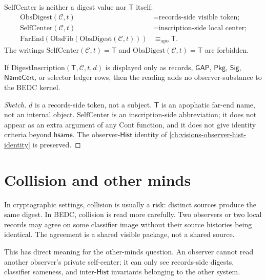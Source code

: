 \begin{principle}
\label{prin:hash-like-self-not-digest-not-T}
$\mathrm{SelfCenter}$ is neither a digest value nor $\mathsf{T}$ itself:
$$
\begin{aligned}
\mathrm{ObsDigest}(\mathcal{C}, t) &= \text{records-side visible token;} \\
\mathrm{SelfCenter}(\mathcal{C}, t) &= \text{inscription-side local center;} \\
\mathrm{FarEnd}(\mathrm{ObsFib}(\mathrm{ObsDigest}(\mathcal{C}, t))) &\equiv_{\mathrm{apo}} \mathsf{T}.
\end{aligned}
$$
The writings $\mathrm{SelfCenter}(\mathcal{C}, t) = \mathsf{T}$ and $\mathrm{ObsDigest}(\mathcal{C}, t) = \mathsf{T}$ are forbidden.
\end{principle}

\begin{theorem}
\label{thm:hash-like-no-subject-preservation}
If $\mathrm{DigestInscription}(\mathsf{T}, \mathcal{C}, t, d)$ is displayed only as records, $\mathsf{GAP}$, $\mathsf{Pkg}$, $\mathsf{Sig}$, $\mathsf{NameCert}$, or selector ledger rows, then the reading adds no observer-substance to the BEDC kernel.
\end{theorem}

\begin{proof}[Sketch]
$d$ is a records-side token, not a subject. $\mathsf{T}$ is an apophatic far-end name, not an internal object. $\mathrm{SelfCenter}$ is an inscription-side abbreviation; it does not appear as an extra argument of any Cont function, and it does not give identity criteria beyond $\mathsf{hsame}$. The observer-$\mathsf{Hist}$ identity of \autoref{ch:visions-observer-hist-identity} is preserved.
\end{proof}

\section{Collision and other minds}
\label{sec:hash-like-collision-other-minds}

In cryptographic settings, collision is usually a risk: distinct sources produce the same digest. In BEDC, collision is read more carefully. Two observers or two local records may agree on some classifier image without their source histories being identical. The agreement is a shared visible package, not a shared source.

This has direct meaning for the other-minds question. An observer cannot read another observer's private self-center; it can only see records-side digests, classifier sameness, and inter-$\mathsf{Hist}$ invariants belonging to the other system.

